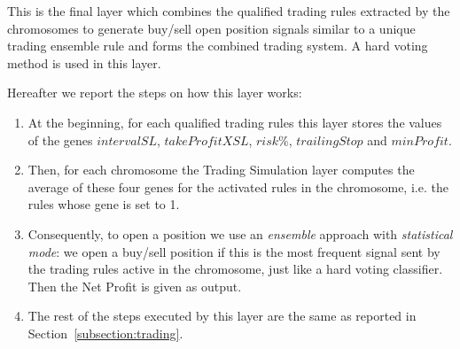 This is the final layer which combines the qualified trading rules extracted by the chromosomes to generate buy/sell open position signals similar to a unique trading ensemble rule and forms the combined trading system. A hard voting method is used in this layer.

\noindent Hereafter we report the steps on how this layer works:

\begin{enumerate}
\setlength\itemsep{0.3em}
\item At the beginning, for each qualified trading rules this layer stores the values of the genes $intervalSL$, $takeProfitXSL$, $risk\%$, $trailingStop$ and $minProfit$.
\item Then, for each chromosome the Trading Simulation layer computes the average of these four genes for the activated rules in the chromosome, i.e. the rules whose gene is set to 1.
\item Consequently, to open a position we use an \textit{ensemble} approach with \textit{statistical mode}: we open a buy/sell position if this is the most frequent signal sent by the trading rules active in the chromosome, just like a hard voting classifier. Then the Net Profit is given as output.
\item The rest of the steps executed by this layer are the same as reported in Section~\ref{subsection:trading}.
\end{enumerate}